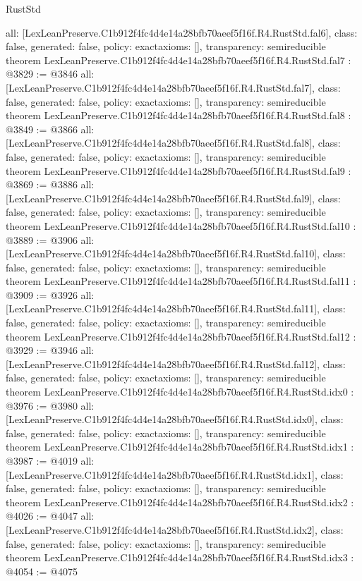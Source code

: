 \begin{lexlean}{RustStd}
\begin{coremodule}
{  all: [LexLeanPreserve.C1b912f4fc4d4e14a28bfb70aeef5f16f.R4.RustStd.fal6],
  class: false,
  generated: false,
  policy: exact{axioms: []},
  transparency: semireducible
}
theorem LexLeanPreserve.C1b912f4fc4d4e14a28bfb70aeef5f16f.R4.RustStd.fal7 : @3829 := @3846 {
  all: [LexLeanPreserve.C1b912f4fc4d4e14a28bfb70aeef5f16f.R4.RustStd.fal7],
  class: false,
  generated: false,
  policy: exact{axioms: []},
  transparency: semireducible
}
theorem LexLeanPreserve.C1b912f4fc4d4e14a28bfb70aeef5f16f.R4.RustStd.fal8 : @3849 := @3866 {
  all: [LexLeanPreserve.C1b912f4fc4d4e14a28bfb70aeef5f16f.R4.RustStd.fal8],
  class: false,
  generated: false,
  policy: exact{axioms: []},
  transparency: semireducible
}
theorem LexLeanPreserve.C1b912f4fc4d4e14a28bfb70aeef5f16f.R4.RustStd.fal9 : @3869 := @3886 {
  all: [LexLeanPreserve.C1b912f4fc4d4e14a28bfb70aeef5f16f.R4.RustStd.fal9],
  class: false,
  generated: false,
  policy: exact{axioms: []},
  transparency: semireducible
}
theorem LexLeanPreserve.C1b912f4fc4d4e14a28bfb70aeef5f16f.R4.RustStd.fal10 : @3889 := @3906 {
  all: [LexLeanPreserve.C1b912f4fc4d4e14a28bfb70aeef5f16f.R4.RustStd.fal10],
  class: false,
  generated: false,
  policy: exact{axioms: []},
  transparency: semireducible
}
theorem LexLeanPreserve.C1b912f4fc4d4e14a28bfb70aeef5f16f.R4.RustStd.fal11 : @3909 := @3926 {
  all: [LexLeanPreserve.C1b912f4fc4d4e14a28bfb70aeef5f16f.R4.RustStd.fal11],
  class: false,
  generated: false,
  policy: exact{axioms: []},
  transparency: semireducible
}
theorem LexLeanPreserve.C1b912f4fc4d4e14a28bfb70aeef5f16f.R4.RustStd.fal12 : @3929 := @3946 {
  all: [LexLeanPreserve.C1b912f4fc4d4e14a28bfb70aeef5f16f.R4.RustStd.fal12],
  class: false,
  generated: false,
  policy: exact{axioms: []},
  transparency: semireducible
}
theorem LexLeanPreserve.C1b912f4fc4d4e14a28bfb70aeef5f16f.R4.RustStd.idx0 : @3976 := @3980 {
  all: [LexLeanPreserve.C1b912f4fc4d4e14a28bfb70aeef5f16f.R4.RustStd.idx0],
  class: false,
  generated: false,
  policy: exact{axioms: []},
  transparency: semireducible
}
theorem LexLeanPreserve.C1b912f4fc4d4e14a28bfb70aeef5f16f.R4.RustStd.idx1 : @3987 := @4019 {
  all: [LexLeanPreserve.C1b912f4fc4d4e14a28bfb70aeef5f16f.R4.RustStd.idx1],
  class: false,
  generated: false,
  policy: exact{axioms: []},
  transparency: semireducible
}
theorem LexLeanPreserve.C1b912f4fc4d4e14a28bfb70aeef5f16f.R4.RustStd.idx2 : @4026 := @4047 {
  all: [LexLeanPreserve.C1b912f4fc4d4e14a28bfb70aeef5f16f.R4.RustStd.idx2],
  class: false,
  generated: false,
  policy: exact{axioms: []},
  transparency: semireducible
}
theorem LexLeanPreserve.C1b912f4fc4d4e14a28bfb70aeef5f16f.R4.RustStd.idx3 : @4054 := @4075 {
}
\end{coremodule}
\end{lexlean}
